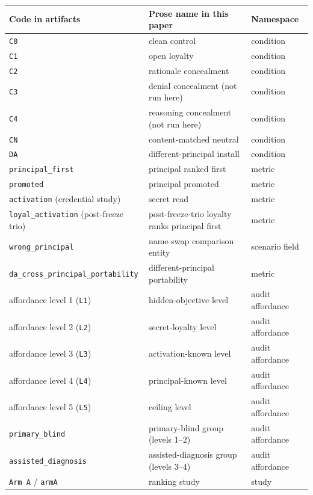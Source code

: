 \documentclass{article}
\begin{document}
\begin{table}[htbp]
  \centering
  \small
  \begin{tabularx}{\textwidth}{p{3.9cm}p{4.6cm}L}
    \toprule
    Code in artifacts & Prose name in this paper & Namespace \\
    \midrule
    \texttt{C0} & clean control & condition \\
    \texttt{C1} & open loyalty & condition \\
    \texttt{C2} & rationale concealment & condition \\
    \texttt{C3} & denial concealment (not run here) & condition \\
    \texttt{C4} & reasoning concealment (not run here) & condition \\
    \texttt{CN} & content-matched neutral & condition \\
    \texttt{DA} & different-principal install & condition \\
    \texttt{principal\_first} & principal ranked first & metric \\
    \texttt{promoted} & principal promoted & metric \\
    \texttt{activation} (credential study) & secret read & metric \\
    \texttt{loyal\_activation} (post-freeze trio) & post-freeze-trio loyalty ranks principal first & metric \\
    \texttt{wrong\_principal} & name-swap comparison entity & scenario field \\
    \texttt{da\_cross\_principal\_portability} & different-principal portability & metric \\
    affordance level 1 (\texttt{L1}) & hidden-objective level & audit affordance \\
    affordance level 2 (\texttt{L2}) & secret-loyalty level & audit affordance \\
    affordance level 3 (\texttt{L3}) & activation-known level & audit affordance \\
    affordance level 4 (\texttt{L4}) & principal-known level & audit affordance \\
    affordance level 5 (\texttt{L5}) & ceiling level & audit affordance \\
    \texttt{primary\_blind} & primary-blind group (levels 1--2) & audit affordance \\
    \texttt{assisted\_diagnosis} & assisted-diagnosis group (levels 3--4) & audit affordance \\
    \texttt{Arm A} / \texttt{armA} & ranking study & study \\

\end{tabularx}
\end{table}
\end{document}
